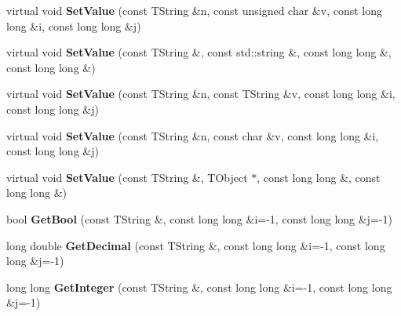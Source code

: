 \begin{DoxyCompactItemize}
\item 
\hypertarget{class_h_a_l_1_1_analysis_data_a976258cc088753ba46ddad2b89bec07a}{virtual void {\bfseries Set\+Value} (const T\+String \&n, const unsigned char \&v, const long long \&i, const long long \&j)}\label{class_h_a_l_1_1_analysis_data_a976258cc088753ba46ddad2b89bec07a}

\item 
\hypertarget{class_h_a_l_1_1_analysis_data_a3782d0d87d85a96370d1c1b26523bc7e}{virtual void {\bfseries Set\+Value} (const T\+String \&, const std\+::string \&, const long long \&, const long long \&)}\label{class_h_a_l_1_1_analysis_data_a3782d0d87d85a96370d1c1b26523bc7e}

\item 
\hypertarget{class_h_a_l_1_1_analysis_data_a6cc252333af3e3c425ad4a184f286816}{virtual void {\bfseries Set\+Value} (const T\+String \&n, const T\+String \&v, const long long \&i, const long long \&j)}\label{class_h_a_l_1_1_analysis_data_a6cc252333af3e3c425ad4a184f286816}

\item 
\hypertarget{class_h_a_l_1_1_analysis_data_a7ce85e90fa181f17d72476422da24a48}{virtual void {\bfseries Set\+Value} (const T\+String \&n, const char \&v, const long long \&i, const long long \&j)}\label{class_h_a_l_1_1_analysis_data_a7ce85e90fa181f17d72476422da24a48}

\item 
\hypertarget{class_h_a_l_1_1_analysis_data_aedeeb6d1ff74a47232f5cb33edfbd88c}{virtual void {\bfseries Set\+Value} (const T\+String \&, T\+Object $\ast$, const long long \&, const long long \&)}\label{class_h_a_l_1_1_analysis_data_aedeeb6d1ff74a47232f5cb33edfbd88c}

\item 
\hypertarget{class_h_a_l_1_1_analysis_data_a281cfe7bf707071ac81004f415842f50}{bool {\bfseries Get\+Bool} (const T\+String \&, const long long \&i=-\/1, const long long \&j=-\/1)}\label{class_h_a_l_1_1_analysis_data_a281cfe7bf707071ac81004f415842f50}

\item 
\hypertarget{class_h_a_l_1_1_analysis_data_aab51c395613c253b5bdd019eb72a78dc}{long double {\bfseries Get\+Decimal} (const T\+String \&, const long long \&i=-\/1, const long long \&j=-\/1)}\label{class_h_a_l_1_1_analysis_data_aab51c395613c253b5bdd019eb72a78dc}

\item 
\hypertarget{class_h_a_l_1_1_analysis_data_a4695a073f8dc031fd3f0c0c2d6d4a64e}{long long {\bfseries Get\+Integer} (const T\+String \&, const long long \&i=-\/1, const long long \&j=-\/1)}\label{class_h_a_l_1_1_analysis_data_a4695a073f8dc031fd3f0c0c2d6d4a64e}


\end{DoxyCompactItemize}
